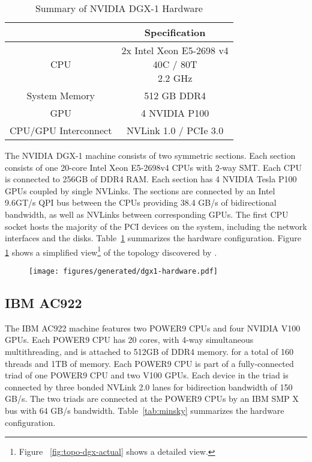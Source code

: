 \begin{table}[]
    \centering
    \caption[NVIDIA DGX-1 hardware summary.]{Summary of NVIDIA DGX-1 Hardware}
    \label{tab:dgx1}
    \begin{tabular}{|c|c|}
    \hline
    \textbf{} & \textbf{Specification}                                          \\ \hline
    CPU           & \makecell{2x Intel Xeon E5-2698 v4 \\ 40C / 80T \\ 2.2 GHz} \\ \hline
    System Memory & 512 GB DDR4                                                 \\ \hline
	GPU           & 4 NVIDIA P100                                               \\ \hline
	CPU/GPU Interconnect  & NVLink 1.0 / PCIe 3.0                                       \\ \hline
    \end{tabular}
\end{table}

The NVIDIA DGX-1 machine consists of two symmetric sections\cite{nvidia2017dgx1}.
Each section consists of one 20-core Intel Xeon E5-2698v4 CPUs with 2-way SMT.
Each CPU is connected to 256GB of DDR4 RAM.
Each section has 4 NVIDIA Tesla P100 GPUs coupled by single NVLinks.
The sections are connected by an Intel 9.6GT/s QPI bus between the CPUs providing 38.4 GB/s of bidirectional bandwidth, as well as NVLinks between corresponding GPUs.
The first CPU socket hosts the majority of the PCI devices on the system, including the network interfaces and the disks.
Table~\ref{tab:dgx1} summarizes the hardware configuration.
Figure \ref{fig:topo-dgx-simple} shows a simplified view\footnote{Figure ~\ref{fig:topo-dgx-actual} shows a detailed view.} of the topology discovered by .



\begin{figure}
    \centering
	\texttt{[image: figures/generated/dgx1-hardware.pdf]}
    \caption[DGX-1 Hardware]{}
    \label{fig:topo-dgx-simple}
\end{figure}


\subsection{IBM AC922}
\label{sec:hal-description}

The IBM AC922 machine features two POWER9 CPUs and four NVIDIA V100 GPUs\cite{caldeira2018ac922}.
Each POWER9 CPU has 20 cores, with 4-way simultaneous multithreading, and is attached to 512GB of DDR4 memory. for a total of 160 threads and 1TB of memory.
Each POWER9 CPU is part of a fully-connected triad of one POWER9 CPU and two V100 GPUs.
Each device in the triad is connected by three bonded NVLink 2.0 lanes for bidirection bandwidth of 150 GB/s.
The two triads are connected at the POWER9 CPUs by an IBM SMP X bus with 64 GB/s bandwidth.
Table~\ref{tab:minsky} summarizes the hardware configuration.


